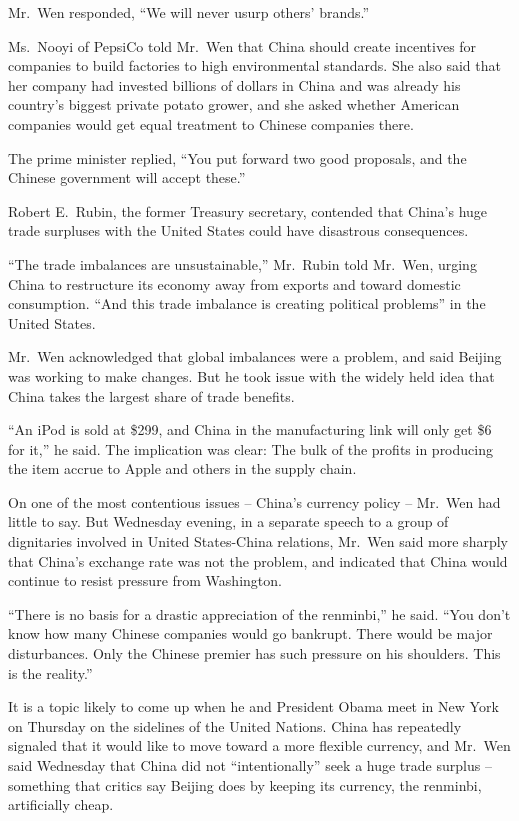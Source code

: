 ﻿\documentclass[12pt]{article}
\begin{document}
Mr.~Wen responded, ``We will never usurp others' brands.''

Ms.~Nooyi of PepsiCo told Mr.~Wen that China should create incentives for companies to build
factories to high environmental standards. She also said that her company had invested billions of
dollars in China and was already his country's biggest private potato grower, and she asked whether
American companies would get equal treatment to Chinese companies there.

The prime minister replied, ``You put forward two good proposals, and the Chinese government will
accept these.''

Robert E.~Rubin, the former Treasury secretary, contended that China's huge trade surpluses with the
United States could have disastrous consequences.

``The trade imbalances are unsustainable,'' Mr.~Rubin told Mr.~Wen, urging China to restructure its
economy away from exports and toward domestic consumption. ``And this trade imbalance is creating
political problems'' in the United States.

Mr.~Wen acknowledged that global imbalances were a problem, and said Beijing was working to make
changes. But he took issue with the widely held idea that China takes the largest share of trade
benefits.

``An iPod is sold at \$299, and China in the manufacturing link will only get \$6 for it,'' he said.
The implication was clear: The bulk of the profits in producing the item accrue to Apple and others
in the supply chain.

On one of the most contentious issues -- China's currency policy -- Mr.~Wen had little to say. But
Wednesday evening, in a separate speech to a group of dignitaries involved in United States-China
relations, Mr.~Wen said more sharply that China's exchange rate was not the problem, and indicated
that China would continue to resist pressure from Washington.

``There is no basis for a drastic appreciation of the renminbi,'' he said. ``You don't know how many
Chinese companies would go bankrupt. There would be major disturbances. Only the Chinese premier has
such pressure on his shoulders. This is the reality.''

It is a topic likely to come up when he and President Obama meet in New York on Thursday on the
sidelines of the United Nations. China has repeatedly signaled that it would like to move toward a
more flexible currency, and Mr.~Wen said Wednesday that China did not ``intentionally'' seek a huge
trade surplus -- something that critics say Beijing does by keeping its currency, the renminbi,
artificially cheap.
\end{document}
